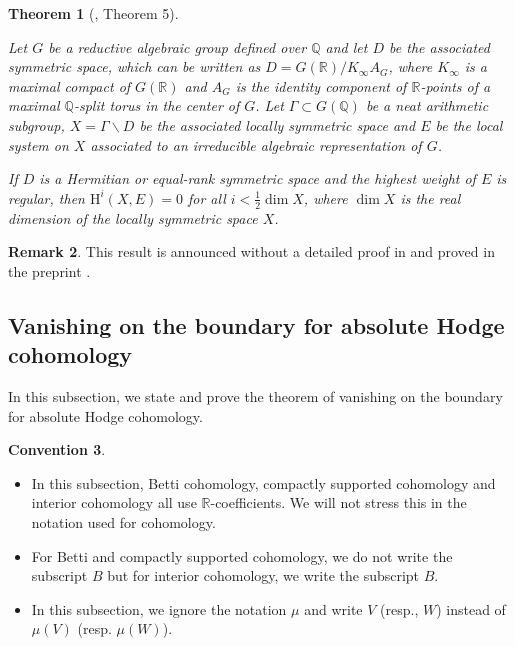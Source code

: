 \documentclass[11pt, a4paper]{amsart}
\theoremstyle{plain}
\newtheorem{theorem}{Theorem}[section]
\theoremstyle{definition}
\newtheorem{remark}[theorem]{Remark}
\newtheorem{convention}[theorem]{Convention}
\numberwithin{equation}{section}
\def\QQ{\mathbb{Q}}
\def\RR{\mathbb{R}}
\begin{document}
\begin{theorem}[\cite{Sap1}, Theorem 5]
\label{thm: Sap}
    \par Let $G$ be a reductive algebraic group defined over $\QQ$ and let $D$ be the associated symmetric space, which can be written as $D = G(\RR) / K_{\infty}A_G$, where $K_{\infty}$ is a maximal compact of $G(\RR)$ and $A_{G}$ is the identity component of $\RR$-points of a maximal $\QQ$-split torus in the center of $G$. Let $\Gamma \subset G(\QQ)$ be a neat arithmetic subgroup, $X = \Gamma \backslash D$ be the associated locally symmetric space and $E$ be the local system on $X$ associated to an irreducible algebraic representation of $G$.
    \par If $D$ is a Hermitian or equal-rank symmetric space and the highest weight of $E$ is \textit{regular}, then $\mathrm{H}^{i}(X, E) = 0$ for all $i < \frac{1}{2}\dim X$, where $\dim X$ is the real dimension of the locally symmetric space $X$. 
\end{theorem}

\begin{remark}
    This result is announced without a detailed proof in \cite{Sap1} and proved in the preprint \cite{Sap2}. 
\end{remark}

\subsection{Vanishing on the boundary for absolute Hodge cohomology}
\label{SS: the proof of the Hodge vanishing}
In this subsection, we state and prove the theorem of vanishing on the boundary for absolute Hodge cohomology. 

\begin{convention}
\label{convention: the proof ov Hodge vanishing}
    \begin{itemize}
        \item In this subsection, Betti cohomology, compactly supported cohomology and interior cohomology all use $\RR$-coefficients. We will not stress this in the notation used for  cohomology.
        \item For Betti and compactly supported cohomology, we do not write the subscript $B$ but for interior cohomology, we write the subscript $B$. 
        \item In this subsection, we ignore the notation $\mu$ and write $V$ (resp., $W$) instead of $\mu(V)$ (resp. $\mu(W)$). 
    \end{itemize}
\end{convention}
\end{document}
